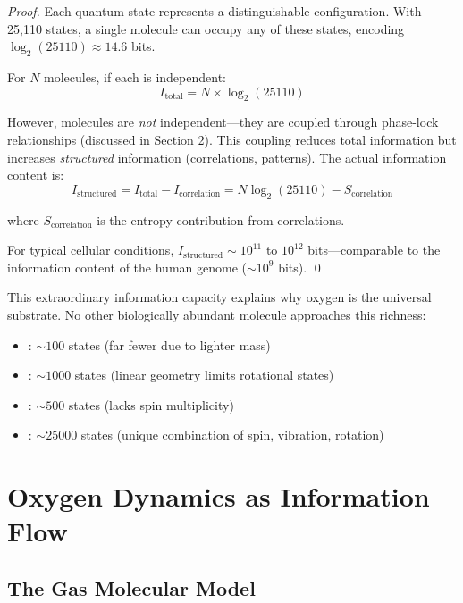 \begin{proof}
Each quantum state represents a distinguishable configuration. With 25,110 states, a single  molecule can occupy any of these states, encoding $\log_2(25110) \approx 14.6$ bits.

For $N$ molecules, if each is independent:
\begin{equation}
I_{\text{total}} = N \times \log_2(25110)
\end{equation}

However, molecules are \textit{not} independent—they are coupled through phase-lock relationships (discussed in Section 2). This coupling reduces total information but increases \textit{structured} information (correlations, patterns). The actual information content is:
\begin{equation}
I_{\text{structured}} = I_{\text{total}} - I_{\text{correlation}} = N \log_2(25110) - S_{\text{correlation}}
\end{equation}

where $S_{\text{correlation}}$ is the entropy contribution from correlations.

For typical cellular conditions, $I_{\text{structured}} \sim 10^{11}$ to $10^{12}$ bits—comparable to the information content of the human genome ($\sim 10^9$ bits). \qed
\end{proof}

\begin{remark}
This extraordinary information capacity explains why oxygen is the universal substrate. No other biologically abundant molecule approaches this richness:
\begin{itemize}
\item {}: $\sim 100$ states (far fewer due to lighter mass)
\item {}: $\sim 1000$ states (linear geometry limits rotational states)
\item {}: $\sim 500$ states (lacks spin multiplicity)
\item {}: $\sim 25000$ states (unique combination of spin, vibration, rotation)
\end{itemize}
\end{remark}

\section{Oxygen Dynamics as Information Flow}

\subsection{The Gas Molecular Model}


